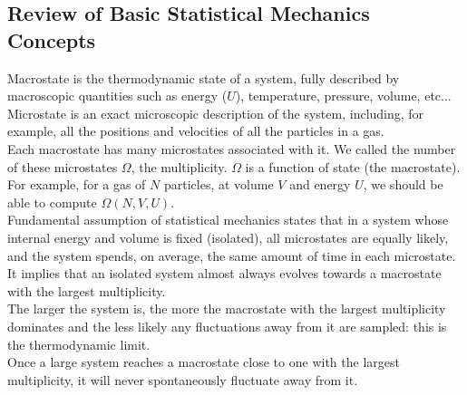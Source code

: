 \documentclass[12pt, a4paper]{article}
\newcounter{exa}
\begin{document}
\subsection{Review of Basic Statistical Mechanics Concepts}

Macrostate is the thermodynamic state of a system, fully described by macroscopic quantities such as energy ($U$), temperature, pressure, volume, etc... \\

Microstate is an exact microscopic description of the system, including, for example, all the positions and velocities of all the particles in a gas. \\

Each macrostate has many microstates associated with it. We called the number of these microstates $\Omega$, the multiplicity. $\Omega$ is a function of state (the macrostate). \\

For example, for a gas of $N$ particles, at volume $V$ and energy $U$, we should be able to compute $\Omega(N,V,U)$. \\

Fundamental assumption of statistical mechanics states that in a system whose internal energy and volume is fixed (isolated), all microstates are equally likely, and the system spends, on average, the same amount of time in each microstate. \\

It implies that an isolated system almost always evolves towards a macrostate with the largest multiplicity. \\

The larger the system is, the more the macrostate with the largest multiplicity dominates and the less likely any fluctuations away from it are sampled: this is the thermodynamic limit. \\

Once a large system reaches a macrostate close to one with the largest multiplicity, it will never spontaneously fluctuate away from it.
\end{document}

